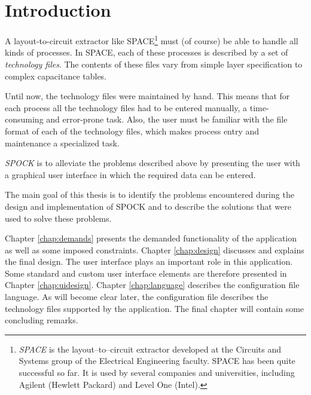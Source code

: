 %
%
%
%  

\chapter{Introduction}
\label{chap:introduction}

A layout-to-circuit extractor like SPACE\footnote{\emph{SPACE} is the 
layout--to--circuit extractor developed at the Circuits and Systems group of 
the Electrical Engineering faculty. SPACE has been quite successful so far. It 
is used by several companies and universities, including Agilent (Hewlett 
Packard) and Level One (Intel).}  must (of course) be able to handle all kinds 
of processes. In SPACE, each of these processes is described by a set of 
\emph{technology files}. The contents of these files vary from simple layer 
specification to complex capacitance tables.

Until now, the technology files were maintained by hand. This means that for 
each process all the technology files had to be entered manually, a 
time-consuming and error-prone task. Also, the user must be familiar with the 
file format of each of the technology files, which makes process entry and 
maintenance a specialized task.

\emph{SPOCK} is to alleviate the problems described above by presenting the 
user with a graphical user interface in which the required data can be entered.

\bigskip \noindent
The main goal of this thesis is to identify the problems encountered during 
the design and implementation of SPOCK and to describe the solutions that were 
used to solve these problems.

\bigskip \noindent
Chapter \ref{chap:demands} presents the demanded functionality of the 
application as well as some imposed constraints. Chapter \ref{chap:design} 
discusses and explains the final design. The user interface plays an important 
role in this application. Some standard and custom user interface elements are 
therefore presented in Chapter \ref{chap:uidesign}. Chapter 
\ref{chap:language} describes the configuration file language. As will become 
clear later, the configuration file describes the technology files supported 
by the application.
The final chapter will contain some concluding remarks.
